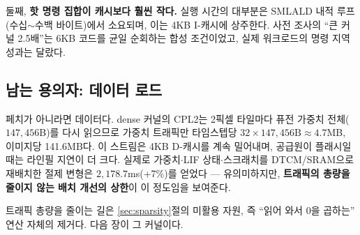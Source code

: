 둘째, \textbf{핫 명령 집합이 캐시보다 훨씬 작다.} 실행 시간의
대부분은 SMLALD 내적 루프(수십$\sim$수백 바이트)에서 소요되며, 이는
4KB I-캐시에 상주한다. 사전 조사의 ``큰 커널 2.5배''는 6KB 코드를
균일 순회하는 합성 조건이었고, 실제 워크로드의 명령 지역성과는
달랐다.

\subsection{남는 용의자: 데이터 로드}

페치가 아니라면 데이터다. dense 커널의 CPL2는 2픽셀 타일마다 퓨전
가중치 전체($147{,}456$B)를 다시 읽으므로 가중치 트래픽만 타임스텝당
$32\times147{,}456\mathrm{B}\approx4.7$MB, 이미지당 141.6MB다. 이
스트림은 4KB D-캐시를 계속 밀어내며, 공급원이 플래시일 때는 라인필
지연이 더 크다. 실제로 가중치$\cdot$LIF 상태$\cdot$스크래치를
DTCM/SRAM으로 재배치한 절제 변형은 $2{,}178.7$ms(+7\%)를 얻었다 ---
유의미하지만, \textbf{트래픽의 총량을 줄이지 않는 배치 개선의 상한}이
이 정도임을 보여준다.

트래픽 총량을 줄이는 길은 \ref{sec:sparsity}절의 미활용 자원, 즉
``읽어 와서 0을 곱하는'' 연산 자체의 제거다. 다음 장이 그 커널이다.
